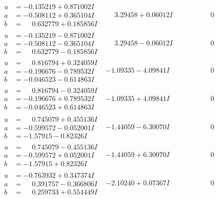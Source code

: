 \documentclass[1p]{elsarticle_modified}
\theoremstyle{definition}
\begin{document}
$$\begin{array}{c|c|c}
\begin{aligned}
u &= -0.135219 + 0.871002 I \\
a &= -0.508112 + 0.365104 I \\
b &= \phantom{-}0.632779 + 0.185856 I\end{aligned}
 & \phantom{-}3.29458 + 0.06012 I & \phantom{-0.000000 } 0 \\ \hline\begin{aligned}
u &= -0.135219 - 0.871002 I \\
a &= -0.508112 - 0.365104 I \\
b &= \phantom{-}0.632779 - 0.185856 I\end{aligned}
 & \phantom{-}3.29458 - 0.06012 I & \phantom{-0.000000 } 0 \\ \hline\begin{aligned}
u &= \phantom{-}0.816794 + 0.324059 I \\
a &= -0.196676 - 0.789532 I \\
b &= -0.046523 - 0.614863 I\end{aligned}
 & -1.09335 - 4.09841 I & \phantom{-0.000000 } 0 \\ \hline\begin{aligned}
u &= \phantom{-}0.816794 - 0.324059 I \\
a &= -0.196676 + 0.789532 I \\
b &= -0.046523 + 0.614863 I\end{aligned}
 & -1.09335 + 4.09841 I & \phantom{-0.000000 } 0 \\ \hline\begin{aligned}
u &= \phantom{-}0.745079 + 0.455136 I \\
a &= -0.599572 - 0.052001 I \\
b &= -1.57915 - 0.82326 I\end{aligned}
 & -1.44059 - 6.30070 I & \phantom{-0.000000 } 0 \\ \hline\begin{aligned}
u &= \phantom{-}0.745079 - 0.455136 I \\
a &= -0.599572 + 0.052001 I \\
b &= -1.57915 + 0.82326 I\end{aligned}
 & -1.44059 + 6.30070 I & \phantom{-0.000000 } 0 \\ \hline\begin{aligned}
u &= -0.763932 + 0.347374 I \\
a &= \phantom{-}0.391757 - 0.366806 I \\
b &= \phantom{-}0.259733 + 0.554449 I\end{aligned}
 & -2.10240 + 0.07367 I & \phantom{-0.000000 } 0 \\ \hline\begin{aligned}

\end{aligned}
\end{array}$$
\end{document}
